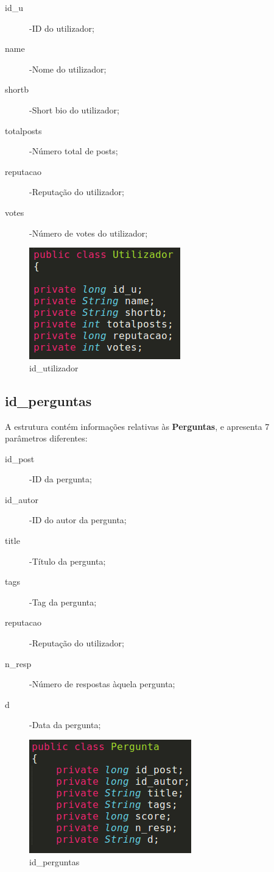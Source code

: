 \documentclass[a4paper]{article}
\begin{document}
	\begin{description}
		\item[id_u] -ID do utilizador;
		\item[name] -Nome do utilizador;
		\item[shortb] -Short bio do utilizador;
		\item[totalposts] -Número total de posts;
		\item[reputacao] -Reputação do utilizador;
		\item[votes] -Número de votes do utilizador;
	\end{description}
	

	\begin{figure}[H]
	\centering
	\includegraphics[scale =0.25]{utilizador.png}
	\caption{id_utilizador}
	\label{img:id_utilizador}
	\end{figure}

	\subsection{id_perguntas}
	A estrutura contém informações relativas às \textbf{Perguntas}, e apresenta 7 parâmetros diferentes:

	\begin{description}
		\item[id_post] -ID da pergunta;
		\item[id_autor] -ID do autor da pergunta;
		\item[title] -Título da pergunta;
		\item[tags] -Tag da pergunta;
		\item[reputacao] -Reputação do utilizador;
		\item[n_resp] -Número de respostas àquela pergunta;
		\item[d] -Data da pergunta;
	\end{description}


	\begin{figure}[H]
	\centering
	\includegraphics[scale =0.25]{perguntas.png}
	\caption{id_perguntas}
	\label{img:id_perguntas}
	\end{figure}
\end{document}
